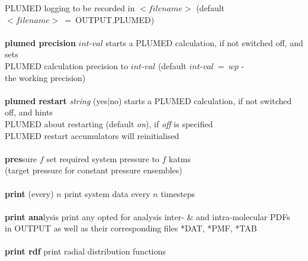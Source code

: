 \begin{tabbing}
\>                                              \> PLUMED logging to be recorded in $<$$filename$$>$ (default \\
\>                                              \> $<$$filename$$>$~=~OUTPUT.PLUMED) \\
\>                                              \> \\
\> {\bf plumed precision} $int$-$val$           \> starts a PLUMED calculation, if not switched off, and sets \\
\>                                              \> PLUMED calculation precision to $int$-$val$ (default $int$-$val$~=~$wp$ - \\
\>                                              \> the \D working precision) \\
\>                                              \> \\
\> {\bf plumed restart} {\em string} (yes$|$no) \> starts a PLUMED calculation, if not switched off, and hints \\
\>                                              \> PLUMED about restarting (default {\em on}), if {\em off} is specified \\
\>                                              \> PLUMED restart accumulators will reinitialised \\
\>                                              \> \\
\> {\bf pres}sure $f$                           \> set required system pressure to $f$ katms \\
\>                                              \> (target pressure for constant pressure ensembles) \\
\>                                              \> \\
\> {\bf print} (every) $n$                      \> print system data every $n$ timesteps \\
\>                                              \> \\
\> {\bf print ana}lysis                         \> print any opted for analysis inter- \& and intra-molecular PDFs \\
\>                                              \> in OUTPUT as well as their corresponding files *DAT, *PMF, *TAB \\
\>                                              \> \\
\> {\bf print rdf}                              \> print radial distribution functions \\

\end{tabbing}
